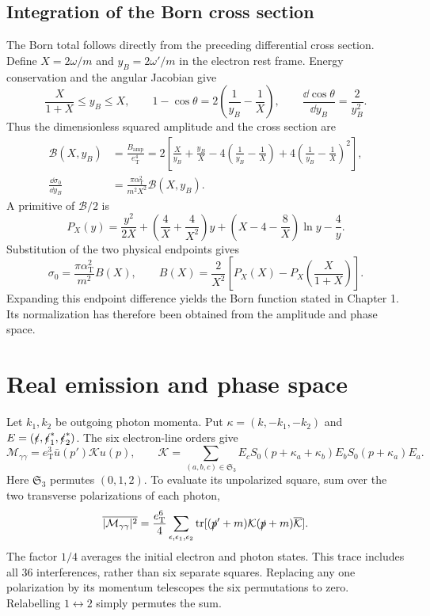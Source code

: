 \subsection{Integration of the Born cross section}
The Born total follows directly from the preceding differential cross
section. Define $X=2\omega/m$ and $y_B=2\omega'/m$ in the electron
rest frame. Energy conservation and the angular Jacobian give
\begin{equation}
 \frac{X}{1+X}\leq y_B\leq X,\qquad
 1-\cos\theta=2\left(\frac1{y_B}-\frac1X\right),\qquad
 \frac{\dd\cos\theta}{\dd y_B}=\frac2{y_B^2}.
\end{equation}
Thus the dimensionless squared amplitude and the cross section are
\begin{align}
 \mathcal B(X,y_B)&=\frac{B_{\mathrm{amp}}}{e_{\mathrm T}^4}
 =2\left[\frac X{y_B}+\frac{y_B}X
 -4\left(\frac1{y_B}-\frac1X\right)
 +4\left(\frac1{y_B}-\frac1X\right)^2\right],\\
 \frac{\dd\sigma_0}{\dd y_B}&=
 \frac{\pi\alpha_{\mathrm T}^2}{m^2X^2}\mathcal B(X,y_B).
\end{align}
A primitive of $\mathcal B/2$ is
\begin{equation}
 P_X(y)=\frac{y^2}{2X}
 +\left(\frac4X+\frac4{X^2}\right)y
 +\left(X-4-\frac8X\right)\ln y-\frac4y.
\end{equation}
Substitution of the two physical endpoints gives
\begin{equation}
 \sigma_0=\frac{\pi\alpha_{\mathrm T}^2}{m^2}B(X),\qquad
 B(X)=\frac2{X^2}\left[P_X(X)-P_X\!\left(\frac X{1+X}\right)\right].
\end{equation}
Expanding this endpoint difference yields the Born function stated in
Chapter 1. Its normalization has therefore been obtained from the
amplitude and phase space.

\section{Real emission and phase space}
Let $k_1,k_2$ be outgoing photon momenta. Put
$\kappa=(k,-k_1,-k_2)$ and
$E=(\slashed\epsilon,\slashed\epsilon_1^*,\slashed\epsilon_2^*)$.
The six electron-line orders give
\begin{equation}
 \mathcal M_{\gamma\gamma}=e_{\mathrm T}^3\bar u(p')\mathcal K u(p),
 \qquad
 \mathcal K=\sum_{(a,b,c)\in\mathfrak S_3}
 E_c S_0(p+\kappa_a+\kappa_b)E_b S_0(p+\kappa_a)E_a.
 \label{eq:comp-supp-double-amplitude}
\end{equation}
Here $\mathfrak S_3$ permutes $(0,1,2)$. To evaluate its unpolarized
square, sum over the two transverse polarizations of each photon,
\begin{equation}
 \overline{|\mathcal M_{\gamma\gamma}|^2}
 =\frac{e_{\mathrm T}^6}{4}\sum_{\epsilon,\epsilon_1,\epsilon_2}
 \operatorname{tr}[(\slashed p'+m)\mathcal K
                             (\slashed p+m)\overline{\mathcal K}].
\end{equation}
The factor $1/4$ averages the initial electron and photon states.
This trace includes all 36 interferences, rather than six separate
squares. Replacing any one polarization by its momentum telescopes
the six permutations to zero. Relabelling $1\leftrightarrow2$ simply
permutes the sum.


